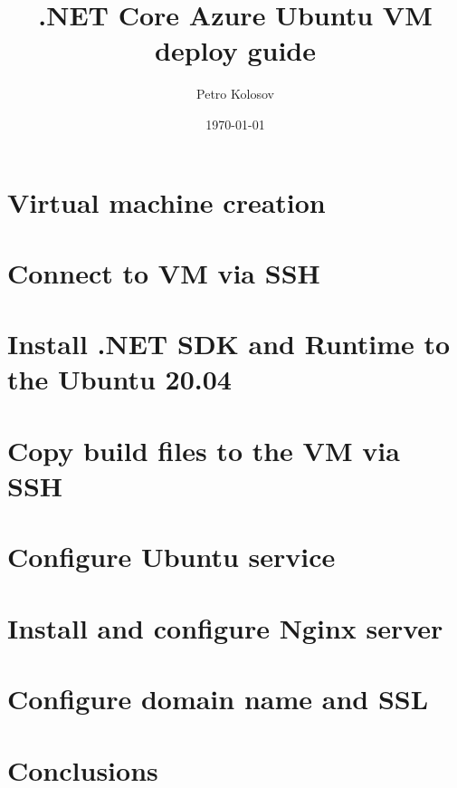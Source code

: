 \documentclass[12pt,letterpaper,oneside,reqno]{amsart}
\title[.NET Core Azure Ubuntu VM deploy guide]
{.NET Core Azure Ubuntu VM deploy guide}
\author[Petro Kolosov]{Petro Kolosov}
\date{\today}
\numberwithin{equation}{section}
\begin{document}
    \begin{abstract}
        
    \end{abstract}

    \maketitle

    \tableofcontents


    \section{Virtual machine creation}\label{sec:virtual-machine-creation}
    


    \section{Connect to VM via SSH}\label{sec:connect-to-vm-via-ssh}
    


    \section{Install .NET SDK and Runtime to the Ubuntu 20.04}\label{sec:install-.net-sdk-to-ubuntu-20.04}
    


    \section{Copy build files to the VM via SSH}\label{sec:copy-build-files-to-the-vm-via-ssh}
    


    \section{Configure Ubuntu service}\label{sec:configure-ubuntu-service}
    


    \section{Install and configure Nginx server}\label{sec:install-and-configure-nginx-server}
    


    \section{Configure domain name and SSL}\label{sec:configure-domain-name-and-ssl}
    


    \section{Conclusions}\label{sec:conclusions}
    

    
    
\end{document}
